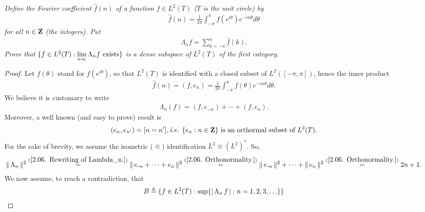 \textit{
Define the Fourier coefficient $\hat{f}(n)$ of a function %
%
  $f\in L^2(T)$ ($T$ is the unit circle) %
%
by
%
  \begin{align*}
  \hat{f}(n) 
    = 
  \frac{1}{2\pi} \int_{\minus \pi}^{\pi} %
    f(e^{i\theta}) e^{\minus i n\theta} d\theta
  \end{align*}
%
for all $n\in {\mathbf Z}$ (the integers). Put 
%
  \begin{align*}
    \Lambda_n f =\sum_{k=\minus n }^{n} \hat{f}(k).
  \end{align*}
%
Prove that %
  $\{f \in {L}^2(T): \underset{n\infty}{\lim}\,\Lambda_n f \text{ exists}\} $ %
%
is a dense subspace of $L^2(T)$ of the first category. %
}
%
\begin{proof}%
Let $f(\theta)$ stand for $f(e^{i\theta})$, so that %
%
  $L^2(T)$ is identified with a closed subset of $L^2([\minus \pi, \pi])$, %
%
hence the inner product %
%
  \begin{align}\label{2.06. Inner product.}
    \hat{f}(n) 
      = 
    (f,e_n) 
      =
    \frac{1}{2\pi} \int_{\minus \pi}^\pi f(\theta)e^{\minus in\theta}d\theta.
  \end{align}
%
We believe it is customary to write %
\begin{align}\label{2.06. Rewriting of Lambda_n.}
  \Lambda_n (f) = (f, e_{\minus n}) + \cdots + (f, e_n).
\end{align}
Moreover, a well known (and easy to prove) result is %
%
  \begin{align}\label{2.06. Orthonormality.}
    (e_{n}, e_{n'}) = [n=n'], \text{\ie } %
    \set{e_n}{n\in\Z} \text{ is an orthormal subset of } L^2(T).
  \end{align}
%
For the sake of brevity, we assume the isometric ($\equiv$) %
identification %
%
  $L^2\equiv (L^2)^\ast$. %
%
So,  %
%
  \begin{align}\label{2.06. Norm of Lambda_n.}
    \| \,\Lambda_n \, \|_{}^2
      \overset{(\ref{2.06. Rewriting of Lambda_n.})}{=}
    \| \,e_{\text{\small{-}} n}  + \cdots + e_n \, \|_{}^2 
      \overset{(\ref{2.06. Orthonormality.})}{=} 
    \| \,e_{\text{\small{-}} n } \, \|_{}^2 + \cdots + \| \,e_{n} \, \|_{}^2
      \overset{(\ref{2.06. Orthonormality.})}{=}
    2n+1.
  \end{align}
%
We now assume, to reach a contradiction, that %
%
  \begin{align}
    B \Def \set{f \in {L}^2(T)}{
      \sup\set{
        \magnitude{\Lambda_n \,f}}{
        \counting{n}
}}
\end{align}
\end{proof}
